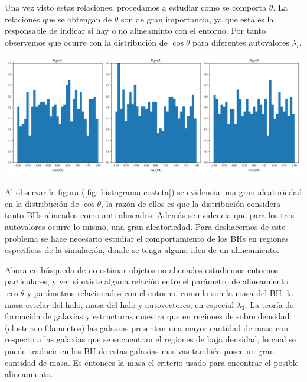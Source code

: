 Una vez visto estas relaciones, procedamos a estudiar como se comporta $\theta$. La relaciones que se obtengan de $\theta$ son de gran importancia, ya que está es la responsable de indicar si hay o no alineaminto con el entorno. Por tanto observemos que ocurre con la distribución de $\cos \theta$ para diferentes autovalores $\lambda_{i}$.
%
\begin{center}
\includegraphics[scale=.35]{./figures/6_Resultados/cosmo01/histograma_cos_theta.png}
\label{fig: histograma costeta}
\end{center}
%
Al observar la figura (\ref{fig: histograma costeta}) se evidencia una gran aleatoriedad en la distribución de $\cos\theta$, la razón de ellos es que la distribución considera tanto BHs alineados como anti-alineados. Además se evidencia que para los tres autovalores ocurre lo mismo, una gran aleatoriedad. Para deshacernos de este problema se hace necesario estudiar el comportamiento de los BHs en regiones especificas de la simulación, donde se tenga alguna idea de un alineamiento.  

Ahora en búsqueda de no estimar objetos no alienados estudiemos entornos particulares, y ver si existe alguna relación entre el parámetro de alineamiento $\cos\theta$ y parámetros relacionados con el entorno, como lo son la masa del BH, la masa estelar del halo, masa del halo y autovectores, en especial $\lambda_{3}$. La teoría de formación de galaxias y estructuras muestra que en regiones de sobre densidad (clusters o filamentos) las galaxias presentan una mayor cantidad de masa  con respecto a las galaxias que se encuentran el regiones de baja densidad, lo cual se puede traducir en los BH de estas galaxias masivas también posee un gran cantidad de masa. Es entonces la masa el criterio usado para encontrar el posible alineamiento. 

